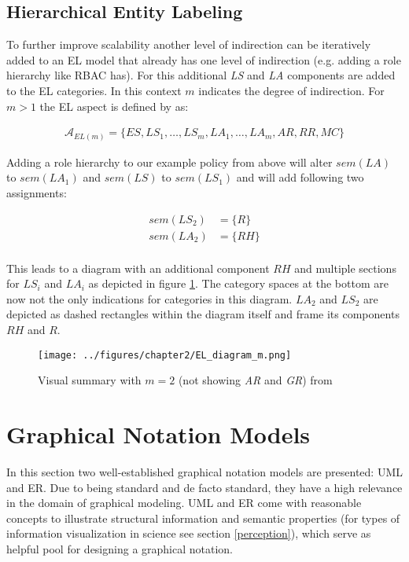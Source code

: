 \documentclass[twoside, openright, 12pt]{book}
\begin{document}
\subsection{Hierarchical Entity Labeling}
\label{HEL}
To further improve scalability another level of indirection can be iteratively added to an EL model that already has one level of indirection (e.g. adding a role hierarchy like RBAC has).
For this additional \textit{LS} and \textit{LA} components are added to the EL categories.
In this context $m$ indicates the degree of indirection.
For $m>1$ the EL aspect is defined by \cite{Amthor18} as:

\begin{align*}
\mathcal{A}_{\mathit{EL}(m)} = \lbrace \mathit{ES}, \mathit{LS}_1, \dots, \mathit{LS}_m, \mathit{LA}_1, \dots, \mathit{LA}_m, \mathit{AR}, \mathit{RR}, \mathit{MC}\rbrace
\end{align*}

\noindent
Adding a role hierarchy to our example policy from above will alter $sem(\mathit{LA})$ to $sem(\mathit{LA}_1)$ and $sem(\mathit{LS})$ to $sem(\mathit{LS}_1)$ and will add following two assignments:

\begin{align*}
sem(\mathit{LS}_2) &= \lbrace R \rbrace\\
sem(\mathit{LA}_2) &= \lbrace \mathit{RH} \rbrace\\
\end{align*}

\noindent
This leads to a diagram with an additional component $RH$ and multiple sections for $\mathit{LS}_i$ and $\mathit{LA}_i$ as depicted in figure \ref{fig:EL_diagram_m}.
The category spaces at the bottom are now not the only indications for categories in this diagram.
$\mathit{LA}_2$ and $\mathit{LS}_2$ are depicted as dashed rectangles within the diagram itself and frame its components $\mathit{RH}$ and $R$.

\begin{figure}[htb]
	\centering
	\texttt{[image: ../figures/chapter2/EL\_diagram\_m.png]}
	\caption{Visual summary with $m=2$ (not showing \textit{AR} and \textit{GR}) from \cite[p.79, figure 4.4]{Amthor18}}
	\label{fig:EL_diagram_m}
\end{figure}



\section{Graphical Notation Models}
\label{graphical_notations}
In this section two well-established graphical notation models are presented: UML and ER.
Due to being standard and de facto standard, they have a high relevance in the domain of graphical modeling. 
UML and ER come with reasonable concepts to illustrate structural information and semantic properties (for types of information visualization in science see section \ref{perception}), which serve as helpful pool for designing a graphical notation.
\end{document}
